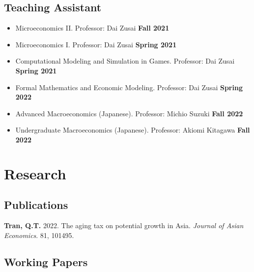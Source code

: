 \documentclass[12pt]{article}
\begin{document}
\subsection{Teaching Assistant}
\begin{itemize}
	\item[ ] Microeconomics II. Professor: Dai Zusai \hfill {\bf Fall 2021}
	\item[ ] Microeconomics I. Professor: Dai Zusai \hfill {\bf Spring 2021}
	\item[ ] Computational Modeling and Simulation in Games. Professor: Dai Zusai \hfill {\bf Spring 2021}
	\item[ ] Formal Mathematics and Economic Modeling. Professor: Dai Zusai \hfill {\bf Spring 2022}
	\item[ ] Advanced Macroeconomics (Japanese). Professor: Michio Suzuki \hfill {\bf Fall 2022}
	\item[ ] Undergraduate Macroeconomics (Japanese). Professor: Akiomi Kitagawa \hfill {\bf Fall 2022}
\end{itemize}


\section{Research}

\subsection{Publications}

\begin{enumerate}[label={[\arabic*]}]

\item \textbf{Tran, Q.T.} 2022. The aging tax on potential growth in Asia. \textit{Journal of Asian Economics}. 81, 101495. 
\end{enumerate}

\subsection{Working Papers}
\end{document}
